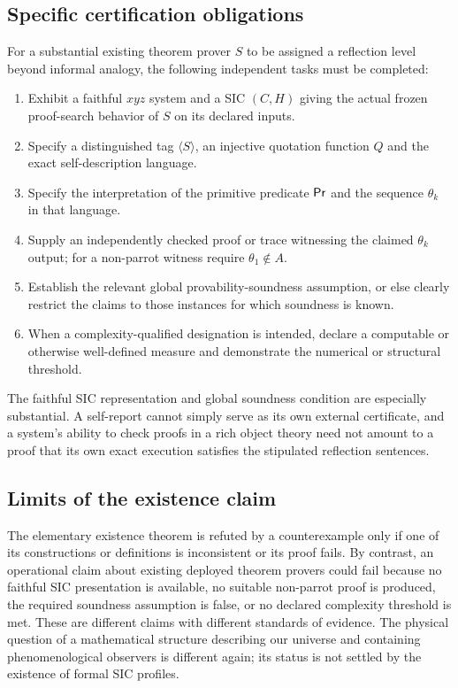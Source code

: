 \documentclass[11pt,letterpaper]{article}
\begin{document}
\subsection{Specific certification obligations}
For a substantial existing theorem prover $S$ to be assigned a reflection level beyond informal analogy, the following independent tasks must be completed:
\begin{enumerate}
\item Exhibit a faithful $xyz$ system and a SIC $(C,H)$ giving the actual frozen proof-search behavior of $S$ on its declared inputs.
\item Specify a distinguished tag $\langle S\rangle$, an injective quotation function $Q$ and the exact self-description language.
\item Specify the interpretation of the primitive predicate $\mathsf{Pr}$ and the sequence $\theta_k$ in that language.
\item Supply an independently checked proof or trace witnessing the claimed $\theta_k$ output; for a non-parrot witness require $\theta_1\notin A$.
\item Establish the relevant global provability-soundness assumption, or else clearly restrict the claims to those instances for which soundness is known.
\item When a complexity-qualified designation is intended, declare a computable or otherwise well-defined measure and demonstrate the numerical or structural threshold.
\end{enumerate}
The faithful SIC representation and global soundness condition are especially substantial. A self-report cannot simply serve as its own external certificate, and a system's ability to check proofs in a rich object theory need not amount to a proof that its own exact execution satisfies the stipulated reflection sentences.

\subsection{Limits of the existence claim}
The elementary existence theorem is refuted by a counterexample only if one of its constructions or definitions is inconsistent or its proof fails. By contrast, an operational claim about existing deployed theorem provers could fail because no faithful SIC presentation is available, no suitable non-parrot proof is produced, the required soundness assumption is false, or no declared complexity threshold is met. These are different claims with different standards of evidence. The physical question of a mathematical structure describing our universe and containing phenomenological observers is different again; its status is not settled by the existence of formal SIC profiles.
\end{document}
